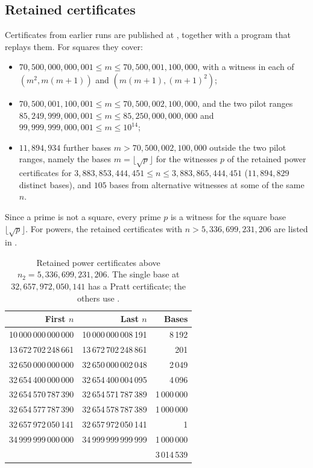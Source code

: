 \documentclass[11pt,colorlinks]{charlie}
\begin{document}
\subsection{Retained certificates}
Certificates from earlier runs are published at \coderepo, together with a program that replays them. For squares they cover:
\begin{itemize}
\item $70{,}500{,}000{,}000{,}001\le m\le70{,}500{,}001{,}100{,}000$, with a witness in each of $(m^2,m(m+1))$ and $(m(m+1),(m+1)^2)$;
\item $70{,}500{,}001{,}100{,}001\le m\le70{,}500{,}002{,}100{,}000$, and the two pilot ranges $85{,}249{,}999{,}000{,}001\le m\le85{,}250{,}000{,}000{,}000$ and $99{,}999{,}999{,}000{,}001\le m\le10^{14}$;
\item $11{,}894{,}934$ further bases $m>70{,}500{,}002{,}100{,}000$ outside the two pilot ranges, namely the bases $m=\lfloor\sqrt p\rfloor$ for the witnesses $p$ of the retained power certificates for $3{,}883{,}853{,}444{,}451\le n\le3{,}883{,}865{,}444{,}451$ ($11{,}894{,}829$ distinct bases), and $105$ bases from alternative witnesses at some of the same $n$.
\end{itemize}
Since a prime is not a square, every prime $p$ is a witness for the square base $\lfloor\sqrt p\rfloor$. For powers, the retained certificates with $n>5{,}336{,}699{,}231{,}206$ are listed in .

\begin{table}[ht]
\centering\small
\begin{tabular}{@{}rrr@{}}
\toprule
First $n$ & Last $n$ & Bases\\
\midrule
10\,000\,000\,000\,000 & 10\,000\,000\,008\,191 & 8\,192\\
13\,672\,702\,248\,661 & 13\,672\,702\,248\,861 & 201\\
32\,650\,000\,000\,000 & 32\,650\,000\,002\,048 & 2\,049\\
32\,654\,400\,000\,000 & 32\,654\,400\,004\,095 & 4\,096\\
32\,654\,570\,787\,390 & 32\,654\,571\,787\,389 & 1\,000\,000\\
32\,654\,577\,787\,390 & 32\,654\,578\,787\,389 & 1\,000\,000\\
32\,657\,972\,050\,141 & 32\,657\,972\,050\,141 & 1\\
34\,999\,999\,000\,000 & 34\,999\,999\,999\,999 & 1\,000\,000\\
\midrule
& & 3\,014\,539\\
\bottomrule
\end{tabular}
\caption{Retained power certificates above $n_2=5{,}336{,}699{,}231{,}206$. The single base at $32{,}657{,}972{,}050{,}141$ has a Pratt certificate; the others use .}\label{tab:archive}
\end{table}
\end{document}
